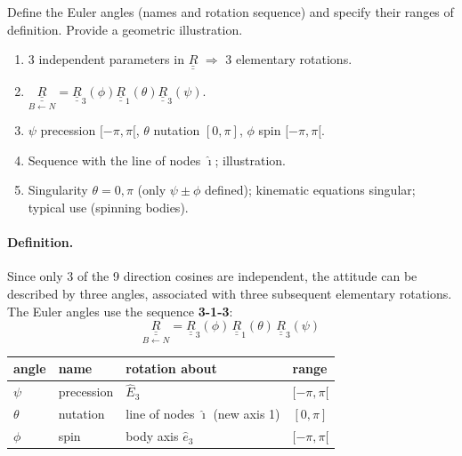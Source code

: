 
\begin{qbox}
Define the Euler angles (names and rotation sequence) and specify their ranges of definition. Provide a geometric illustration.
\end{qbox}

\begin{outline}
\begin{enumerate}
\item 3 independent parameters in $\underline{\underline R}$ $\Rightarrow$ 3 elementary rotations.
\item $\underset{B\leftarrow N}{\underline{\underline R}}=\underline{\underline R}_3(\phi)\underline{\underline R}_1(\theta)\underline{\underline R}_3(\psi)$.
\item $\psi$ precession $[-\pi,\pi[$, $\theta$ nutation $[0,\pi]$, $\phi$ spin $[-\pi,\pi[$.
\item Sequence with the line of nodes $\hat\imath$; illustration.
\item Singularity $\theta=0,\pi$ (only $\psi\pm\phi$ defined); kinematic equations singular; typical use (spinning bodies).
\end{enumerate}
\end{outline}

\answer
\paragraph{Definition.} Since only 3 of the 9 direction cosines are independent, the attitude can be described by three angles,
associated with three subsequent elementary rotations. The Euler angles use the sequence \textbf{3-1-3}:
\begin{equation}
\underset{B\leftarrow N}{\underline{\underline{R}}}=\underline{\underline{R}}_{3}(\phi)\,\underline{\underline{R}}_{1}(\theta)\,\underline{\underline{R}}_{3}(\psi)
\end{equation}
\begin{center}
\small
\begin{tabular}{@{}llll@{}}
\toprule
angle & name & rotation about & range\\
\midrule
$\psi$ & precession & $\hat E_3$ & $[-\pi,\pi[$\\
$\theta$ & nutation & line of nodes $\hat\imath$ (new axis 1) & $[0,\pi]$\\
$\phi$ & spin & body axis $\hat e_3$ & $[-\pi,\pi[$\\
\bottomrule
\end{tabular}
\end{center}

